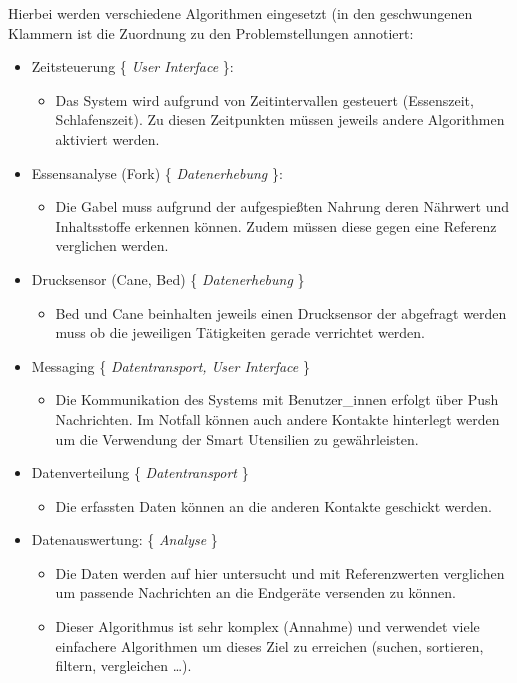 Hierbei werden verschiedene Algorithmen eingesetzt (in den geschwungenen Klammern ist die Zuordnung zu den Problemstellungen annotiert:
\begin{itemize}
	\item Zeitsteuerung  \{ \textit{User Interface }\}: 
	\begin{itemize}
		\item Das System wird aufgrund von Zeitintervallen gesteuert (Essenszeit, Schlafenszeit). Zu diesen Zeitpunkten müssen jeweils andere Algorithmen aktiviert werden.
	\end{itemize}

	\item Essensanalyse (Fork) \{ \textit{Datenerhebung} \}: 
	\begin{itemize}
		\item Die Gabel muss aufgrund der aufgespießten Nahrung deren Nährwert und Inhaltsstoffe erkennen können. Zudem müssen diese gegen eine Referenz verglichen werden. 
	\end{itemize}

	\item Drucksensor (Cane, Bed) \{ \textit{Datenerhebung} \} 
	\begin{itemize}
		\item Bed und Cane beinhalten jeweils einen Drucksensor der abgefragt werden muss ob die jeweiligen Tätigkeiten gerade verrichtet werden. 
	\end{itemize}

	\item Messaging \{ \textit{Datentransport, User Interface} \} 
	\begin{itemize}
		\item Die Kommunikation des Systems mit Benutzer\_innen erfolgt über Push Nachrichten. Im Notfall können auch andere Kontakte hinterlegt werden um die Verwendung der Smart Utensilien zu gewährleisten. 
	\end{itemize}

	\item Datenverteilung \{ \textit{Datentransport} \} 
	\begin{itemize}
		\item Die erfassten Daten können an die anderen Kontakte geschickt werden. 
	\end{itemize}
	
	\item Datenauswertung: \{ \textit{Analyse} \}
	\begin{itemize}
		\item Die Daten werden auf hier untersucht und mit Referenzwerten verglichen um passende Nachrichten an die Endgeräte versenden zu können. 
		\item Dieser Algorithmus ist sehr komplex (Annahme) und verwendet viele einfachere Algorithmen um dieses Ziel zu erreichen (suchen, sortieren, filtern, vergleichen \dots).
	\end{itemize}
\end{itemize}


